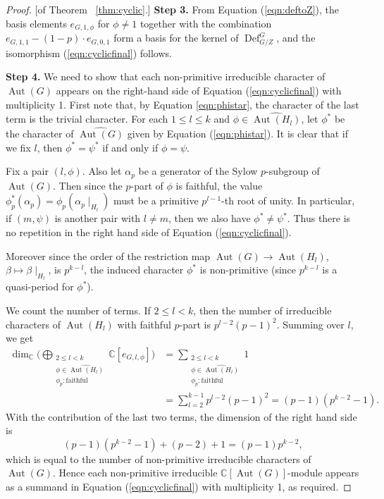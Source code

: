 \documentclass[12pt]{article}
\theoremstyle{plain}
\theoremstyle{definition}
\newcommand{\defl}{\operatorname{Def}}
\newcommand{\Aut}{\operatorname{Aut}}
\begin{document}
\begin{proof}{[of Theorem ~\ref{thm:cyclic}.]}
\smallskip
\noindent\textbf{Step 3.}
From Equation (\ref{eqn:deftoZ}), the basis elements $e_{G, 1, \phi}$ for $\phi\not=1$ together with the combination $e_{G, 1, 1} - (1-p)\cdot e_{G, 0, 1}$ form a basis for the kernel of $\defl^G_{G/Z}$, and the isomorphism (\ref{eqn:cyclicfinal}) follows.

\smallskip
\noindent\textbf{Step 4.}
We need to show that each non-primitive irreducible character of $\Aut(G)$ appears on the right-hand side of Equation (\ref{eqn:cyclicfinal}) with multiplicity 1. First note that, by Equation \ref{eqn:phistar}, the character of the last term is the trivial character. For each $1\le l\le k$ and $\phi\in\widehat{\Aut(H_l)}$, let $\phi^*$ be the character of $\widehat{\Aut(G)}$ given by Equation (\ref{eqn:phistar}). It is clear that if we fix $l$, then $\phi^* = \psi^*$ if and only if $\phi = \psi$.

Fix a pair $(l, \phi)$. Also let $\alpha_p$ be a generator of the Sylow $p$-subgroup of $\Aut(G)$. Then since the $p$-part of $\phi$ is faithful, the value $\phi^*_p(\alpha_p) = \phi_p(\alpha_p\mid_{H_l})$ must be a primitive $p^{l-1}$-th root of unity. In particular, if $(m, \psi)$ is another pair with $l\not= m$, then we also have $\phi^*\not=\psi^*$. Thus there is no repetition in the right hand side of Equation (\ref{eqn:cyclicfinal}).

Moreover since the order of the restriction map $\Aut(G)\to \Aut(H_l)$, $\beta\mapsto \beta\mid_{H_l}$, is $p^{k-l}$, the induced character $\phi^*$ is non-primitive (since $p^{k-l}$ is a quasi-period for $\phi^*$).

We count the number of terms. If $2\le l< k$, then the number of irreducible characters of $\Aut(H_l)$ with faithful $p$-part is $p^{l-2}(p-1)^2$. Summing over $l$, we get
\begin{align*}
\dim_\mathbb C\Big(\bigoplus_{\substack{2\le l< k\\ \phi\in \widehat{\Aut(H_l)}\\ \phi_p:\text{faithful}}}\mathbb C[e_{G, l, \phi}]\Big)&=\sum_{\substack{2\le l< k\\ \phi\in \widehat{\Aut(H_l)}\\ \phi_p:\text{faithful}}}1 \\ &= \sum_{l=2}^{k-1} p^{l-2}(p-1)^2 = (p-1)(p^{k-2}-1).
\end{align*}
With the contribution of the last two terms, the dimension of the right hand side is
\[
(p-1)(p^{k-2}-1) + (p-2) + 1 = (p-1)p^{k-2},
\]
which is equal to the number of non-primitive irreducible characters of $\Aut(G)$. Hence each non-primitive irreducible $\mathbb C[\Aut(G)]$-module appears as a summand in Equation (\ref{eqn:cyclicfinal}) with multiplicity 1, as required.
\end{proof}
\end{document}
